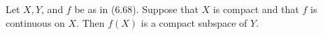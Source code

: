 Let $X, Y$, and $f$ be as in (6.68). Suppose that $X$ is compact and that $f$ is continuous on $X$. Then $f(X)$ is a compact subspace of $Y$.